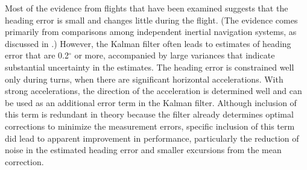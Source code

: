 \documentclass[12pt,twoside,english,12pt,twoside,english]{article}\usepackage[]{graphicx}\usepackage[]{color}
\let\OrgIndex\index
\renewcommand*{\index}[1]{\OrgIndex{#1}}
\begin{document}
 Most of the evidence from flights that have been examined suggests
that the heading error
is small and changes little during the flight. (The evidence comes
primarily from comparisons
among independent inertial navigation
systems, as discussed in \citet{Cooper2016ncartn}.) However, the
Kalman filter often leads to estimates of heading error that are 0.2$^{\circ}$
or more, accompanied by large variances that indicate substantial
uncertainty in the estimates.
The heading error is constrained
well only during turns, when there are significant horizontal accelerations.
With strong accelerations, the direction of the acceleration is determined
well and can be used as an additional error
term in the Kalman filter. Although inclusion of this term is redundant
in theory because the filter already determines optimal corrections
to minimize the measurement errors, specific inclusion of this term
did lead to apparent improvement in performance, particularly the
reduction of noise in the estimated heading error and smaller excursions
from the mean correction.
\end{document}
